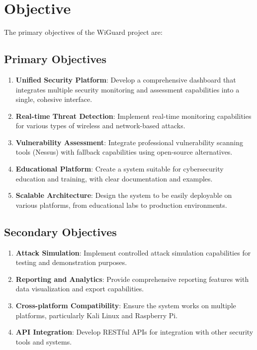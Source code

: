 \documentclass[12pt,a4paper]{report}
\begin{document}
\section{Objective}

The primary objectives of the WiGuard project are:

\subsection{Primary Objectives}
\begin{enumerate}
    \item \textbf{Unified Security Platform}: Develop a comprehensive dashboard that integrates multiple security monitoring and assessment capabilities into a single, cohesive interface.
    
    \item \textbf{Real-time Threat Detection}: Implement real-time monitoring capabilities for various types of wireless and network-based attacks.
    
    \item \textbf{Vulnerability Assessment}: Integrate professional vulnerability scanning tools (Nessus) with fallback capabilities using open-source alternatives.
    
    \item \textbf{Educational Platform}: Create a system suitable for cybersecurity education and training, with clear documentation and examples.
    
    \item \textbf{Scalable Architecture}: Design the system to be easily deployable on various platforms, from educational labs to production environments.
\end{enumerate}

\subsection{Secondary Objectives}
\begin{enumerate}
    \item \textbf{Attack Simulation}: Implement controlled attack simulation capabilities for testing and demonstration purposes.
    
    \item \textbf{Reporting and Analytics}: Provide comprehensive reporting features with data visualization and export capabilities.
    
    \item \textbf{Cross-platform Compatibility}: Ensure the system works on multiple platforms, particularly Kali Linux and Raspberry Pi.
    
    \item \textbf{API Integration}: Develop RESTful APIs for integration with other security tools and systems.
\end{enumerate}
\end{document}
